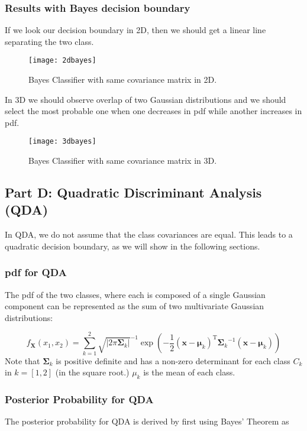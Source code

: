 \documentclass[]{../../ncmathy}
\begin{document}
		\subsubsection{Results with Bayes decision boundary}
	If we look our decision boundary in 2D, then we should get a linear line separating the two class.  
	
	\begin{figure}[H]
		\centering\texttt{[image: 2dbayes]}
		\caption{Bayes Classifier with same covariance matrix in 2D.}
	\end{figure}
	
	In 3D we should observe overlap of two Gaussian distributions and we should select the most probable one when one decreases in pdf while another increases in pdf.
		\begin{figure}[H]
				\centering\texttt{[image: 3dbayes]}
				\caption{Bayes Classifier with same covariance matrix in 3D.}
		\end{figure}

	\subsection{Part D: Quadratic Discriminant Analysis (QDA)}
		In QDA, we do not assume that the class covariances are equal. This leads to a quadratic decision boundary, as we will show in the following sections.
		
		\subsubsection{pdf for QDA}
			The pdf of the two classes, where each is composed of a single Gaussian component can be represented as the sum of two multivariate Gaussian distributions:
			
			\begin{equation}
				f_{\mathbf X}(x_1, x_2) = \sum_{k=1}^2\sqrt{|2\pi\boldsymbol\Sigma_k|}^{-1}\exp\left(-\frac{1}{2}({\mathbf x}-{\boldsymbol\mu_k})^\mathrm{T}{\boldsymbol\Sigma_k}^{-1}({\mathbf x}-{\boldsymbol\mu_k})\right)
			\end{equation}		
			Note that $\boldsymbol\Sigma_k$ is positive definite and has a non-zero determinant for each class $C_k$ in $k = [1,2]$ (in the square root.) $\mu_k$ is the mean of each class.
		
		\subsubsection{Posterior Probability for QDA}
			The posterior probability for QDA is derived by first using Bayes' Theorem as
			
\end{document}
